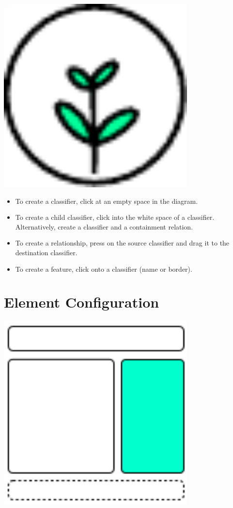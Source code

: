 \includegraphics[width=10cm]{../../gui/source/resources/tool_create.pdf}
\begin{itemize}
\item To create a classifier, click at an empty space in the diagram.
\item To create a child classifier, click into the white space of a classifier.
    Alternatively, create a classifier and a containment relation.
\item To create a relationship, press on the source classifier and drag it to the destination classifier.
\item To create a feature, click onto a classifier (name or border).
\end{itemize}

\section{Element Configuration}

\includegraphics[width=10cm]{main_window_sketch_3.png}


